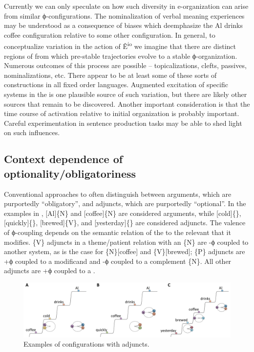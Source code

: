   Currently we can only speculate on how such diversity in e-organization can arise from similar ϕ-con\-fig\-u\-ra\-tions. The nominalization of verbal meaning experiences may be understood as a consequence of  biases which deemphasize the {\textbar}Al drinks coffee{\textbar} configuration relative to some other configuration. In general, to conceptualize variation in the action of Ê\textsuperscript{io} we imagine that there are distinct regions of  from which pre-stable trajectories evolve to a stable ϕ-organization. Numerous outcomes of this process are possible -- topicalizations, clefts, passives, nominalizations, etc. There appear to be at least some of these sorts of constructions in all fixed order languages. Augmented excitation of specific systems in the  is one plausible source of such variation, but there are likely other sources that remain to be discovered. Another important consideration is that the time course of activation relative to initial organization is probably important. Careful experimentation in sentence production tasks may be able to shed light on such influences.

\subsection{Context dependence of optionality/obligatoriness}

Conventional approaches to  often distinguish between arguments, which are purportedly “obligatory”, and adjuncts, which are purportedly “optional”. In the examples in {}, [Al]\{N\} and [coffee]\{N\} are considered arguments, while [cold]\{\}, [quickly]\{\}, [brewed]\{V\}, and [yesterday]\{\} are considered adjuncts. The valence of  ϕ-coupling depends on the semantic relation of the  to the relevant  that it modifies. \{V\} adjuncts in a theme/patient relation with an \{N\} are -ϕ coupled to another system, as is the case for \{N\}[coffee] and \{V\}[brewed]; \{P\} adjuncts are +ϕ coupled to a modificand and -ϕ coupled to a complement \{N\}. All other adjuncts are +ϕ coupled to a .

  
\begin{figure}
\includegraphics[width=\textwidth]{figures/Tilsen-img83.png}
\caption{Examples of configurations with adjuncts.}
\label{fig:4:33}
\end{figure}
 

